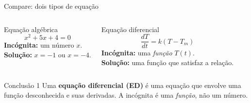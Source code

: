 \documentclass[12pt]{beamer}
\begin{document}
\begin{frame}{Compare: dois tipos de equação}

  \begin{columns}[T]

      \begin{block}{Equação algébrica}
        \[
          x^2 + 5x + 4 = 0
        \]
        \vspace{4pt}
        \textbf{Incógnita:} um número $x$.\\[4pt]
        \textbf{Solução:} $x = -1$ ou $x = -4$.
      \end{block}

      \begin{block}{Equação diferencial}
        \[
          \frac{dT}{dt} = k(T - T_m)
        \]
        \vspace{4pt}
        \textbf{Incógnita:} uma \emph{função} $T(t)$.\\[4pt]
        \textbf{Solução:} uma função que satisfaz a relação.
      \end{block}

  \end{columns}

  \vspace{14pt}
  \pause

  \begin{exampleblock}{Conclusão 1}
    Uma \textbf{equação diferencial (ED)} é uma equação que envolve
    uma função desconhecida e suas derivadas.
    A incógnita é uma \emph{função}, não um número.
  \end{exampleblock}

\end{frame}
\end{document}
